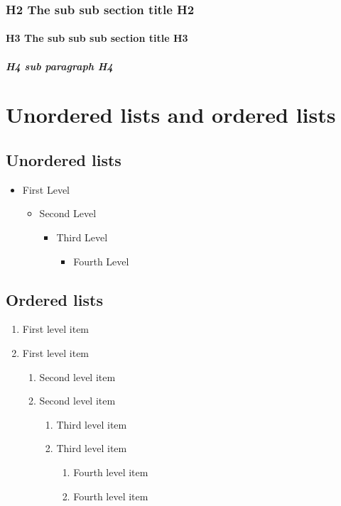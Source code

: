 \documentclass[Theme1]{{template_material/eurostat}}
\begin{document}
\subsubsection{H2 The sub sub section title H2}
\lipsum[1-1]
\paragraph{H3 The sub sub sub section title H3}
\lipsum[1-1]
\subparagraph{H4 sub paragraph H4}
\lipsum[1-1]

\newpage %
\section{Unordered lists and ordered lists}

\subsection{Unordered lists}
 \begin{itemize}
   \item  First Level
   \begin{itemize}
     \item  Second Level
     \begin{itemize}
       \item  Third Level
       \begin{itemize}
         \item  Fourth Level
       \end{itemize}
     \end{itemize}
   \end{itemize}
 \end{itemize}

\subsection{Ordered lists}
\begin{enumerate}
   \item First level item
   \item First level item
   \begin{enumerate}
     \item Second level item
     \item Second level item
     \begin{enumerate}
       \item Third level item
       \item Third level item
       \begin{enumerate}
         \item Fourth level item
         \item Fourth level item
       \end{enumerate}
     \end{enumerate}
   \end{enumerate}
 \end{enumerate}
\newpage %
\end{document}
